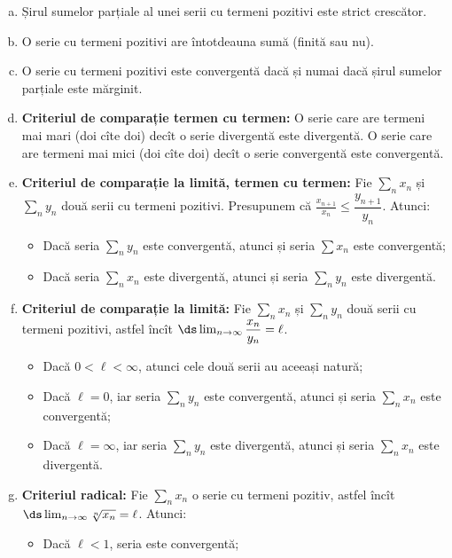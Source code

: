 \begin{enumerate}[(a)]
\item Șirul sumelor parțiale al unei serii cu termeni pozitivi este
  strict crescător.
\item O serie cu termeni pozitivi are întotdeauna sumă (finită sau nu).
\item O serie cu termeni pozitivi este convergentă dacă și numai dacă
  șirul sumelor parțiale este mărginit.
\item \textbf{Criteriul de comparație termen cu termen:} O serie care are termeni
  mai mari (doi cîte doi) decît o serie divergentă este divergentă.
  O serie care are termeni mai mici (doi cîte doi) decît o serie convergentă
  este convergentă. 
\item \textbf{Criteriul de comparație la limită, termen cu termen:}
  Fie $ \sum_n x_n $ și
  $ \sum_n y_n $ două serii cu termeni pozitivi. Presupunem că
  $ \frac{x_{n+1}}{x_n} \leq \dfrac{y_{n+1}}{y_n} $. Atunci:
  \begin{itemize}
  \item Dacă seria $ \sum_n y_n $ este convergentă, atunci și seria
    $ \sum x_n $ este convergentă;
  \item Dacă seria $ \sum_n x_n $ este divergentă, atunci și seria
    $ \sum_n y_n $ este divergentă.
  \end{itemize}
\item \textbf{Criteriul de comparație la limită:} Fie $ \sum_n x_n $ și
  $ \sum_n y_n $ două serii cu termeni pozitivi, astfel încît
  $ \ds\lim_{n \to \infty} \dfrac{x_n}{y_n} = \ell $.
  \begin{itemize}
  \item Dacă $ 0 < \ell < \infty $, atunci cele două serii au aceeași natură;
  \item Dacă $ \ell = 0 $, iar seria $ \sum_n y_n $ este convergentă, atunci și
    seria $ \sum_n x_n $ este convergentă;
  \item Dacă $ \ell = \infty $, iar seria $ \sum_n y_n $ este divergentă, atunci
    și seria $ \sum_n x_n $ este divergentă.
  \end{itemize}
\item \textbf{Criteriul radical:} Fie $ \sum_n x_n $ o serie cu
  termeni pozitiv, astfel încît $ \ds\lim_{n \to \infty} \sqrt[n]{x_n} = \ell $.
  Atunci:
  \begin{itemize}
  \item Dacă $ \ell < 1 $, seria este convergentă;

\end{itemize}
\end{enumerate}
